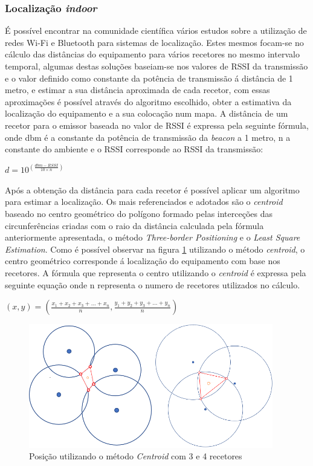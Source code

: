 \subsubsection{Localização \textit{indoor}} \label{indoor}
\par
É possível encontrar na comunidade científica vários estudos sobre a utilização de redes Wi-Fi e Bluetooth para sistemas de localização. Estes mesmos focam-se no cálculo das distâncias do equipamento para vários recetores no mesmo intervalo temporal, algumas destas soluções baseiam-se nos valores de RSSI da transmissão e o valor definido como constante da potência de transmissão á distância de 1 metro, e estimar a sua distância aproximada de cada recetor, com essas aproximações é possível através do algoritmo escolhido\cite{Wang2013}, obter a estimativa da localização do equipamento e a sua colocação num mapa.
A distância de um recetor para o emissor baseada no valor de RSSI é expressa pela seguinte fórmula, onde dbm é a constante da potência de transmissão da \textit{beacon} a 1 metro, n a constante do ambiente e o RSSI corresponde ao RSSI da transmissão:
\par
\begin{center}
$d=10^(\frac{dbm-RSSI}{10 \times n})$
\end{center}

\par
Após a obtenção da distância para cada recetor é possível aplicar um algoritmo para estimar a localização. Os mais referenciados e adotados são o \textit{centroid} baseado no centro geométrico do polígono formado pelas interceções das circunferências criadas com o raio da distância calculada pela fórmula anteriormente apresentada, o método \textit{Three-border Positioning} e o \textit{Least Square Estimation}.
Como é possível observar na figura \ref{centroid} utilizando o método \textit{centroid}, o centro geométrico corresponde á localização do equipamento com base nos recetores. A fórmula que representa o centro utilizando o \textit{centroid} é expressa pela seguinte equação onde n representa o numero de recetores utilizados no cálculo.
\par
\begin{center}
$ (x,y)= (\frac{x_{1}+x_{2}+x_{3}+...+x_{n}}{n},\frac{y_{1}+y_{2}+y_{3}+...+y_{n}}{n})$
\end{center}

\begin{figure}[htb]
\centering
\includegraphics[width=0.95\textwidth]{images/centroid3.png}
\caption{Posição utilizando o método \textit{Centroid} com 3 e 4 recetores}\label{centroid}
\end{figure}


